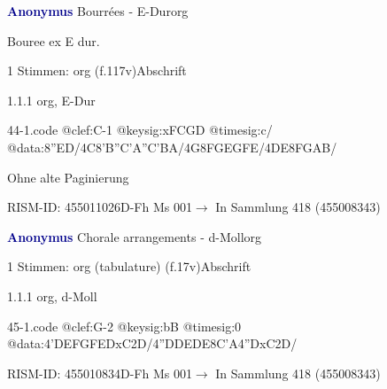 \documentclass[twocolumn]{book}
\begin{document}
\par \vspace{7pt} \textcolor{darkblue}{\textbf{Anonymus  }}\hfillplus{\textbf{[44]}}\newline Bourrées - E-Dur\newline org
\par \begin{itshape}[f.117v, heading:] Bouree ex E dur.\end{itshape} 
\par \textcolor{darkblue}{}  1 Stimmen: org  (f.117v)\newline Abschrift
\par 1.1.1  org, E-Dur  
\begin{filecontents*}{44-1.code}
@clef:C-1
@keysig:xFCGD
@timesig:c/
@data:{8''ED}/4C{8'B''C}{'A''C'BA}/4G{8FG}{EGFE}/4DE{8FGAB}/
\end{filecontents*}
\newline
%
\par Ohne alte Paginierung
\par RISM-ID: 455011026\newline D-Fh  Ms 001\newline $\rightarrow$ In Sammlung 418 (455008343)
      
\par \vspace{7pt} \textcolor{darkblue}{\textbf{Anonymus  }}\hfillplus{\textbf{[45]}}\newline Chorale arrangements - d-Moll\newline org
\par \begin{itshape}\end{itshape} 
\par \textcolor{darkblue}{}  1 Stimmen: org (tabulature)  (f.17v)\newline Abschrift
\par 1.1.1  org, d-Moll  
\begin{filecontents*}{45-1.code}
@clef:G-2
@keysig:bB
@timesig:0
@data:4'DEFGFEDxC2D/4''DDEDE{8C'A}4''DxC2D/
\end{filecontents*}
\newline
%
\par RISM-ID: 455010834\newline D-Fh  Ms 001\newline $\rightarrow$ In Sammlung 418 (455008343)
      
\end{document}
